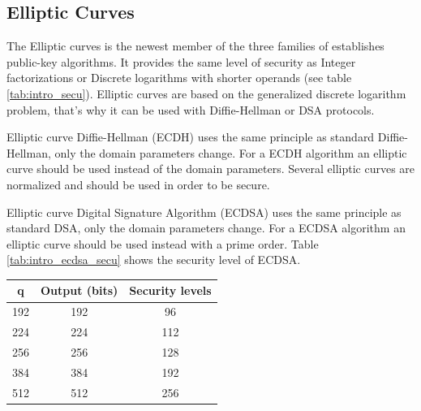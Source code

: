 \subsection*{Elliptic Curves}

The Elliptic curves is the newest member of the three families of establishes
public-key algorithms. It provides the same level of security as Integer
factorizations or Discrete logarithms with shorter operands (see table
\ref{tab:intro_secu}). Elliptic curves are based on the generalized discrete
logarithm problem, that's why it can be used with Diffie-Hellman or DSA
protocols.

Elliptic curve Diffie-Hellman (ECDH) uses the same principle as standard
Diffie-Hellman, only the domain parameters change. For a ECDH algorithm an
elliptic curve should be used instead of the domain parameters. Several
elliptic curves are normalized \cite{RFC4492} and should be used in order to be
secure.

Elliptic curve Digital Signature Algorithm (ECDSA) uses the same principle as
standard DSA, only the domain parameters change. For a ECDSA algorithm an
elliptic curve should be used instead with a prime order. Table
\ref{tab:intro_ecdsa_secu} shows the security level of ECDSA.\newline

\begin{center}
\begin{tabular}{|*{3}{c|}}

\hline
q	& Output (bits)	& Security levels \\
\hline
192	& 192			&	96  \\
224	& 224 			&	112 \\
256	& 256 			& 	128	\\
384 & 384			&  	192 \\
512	& 512			&	256 \\
\hline

\end{tabular}
\label{tab:intro_ecdsa_secu}

\end{center}

\newpage